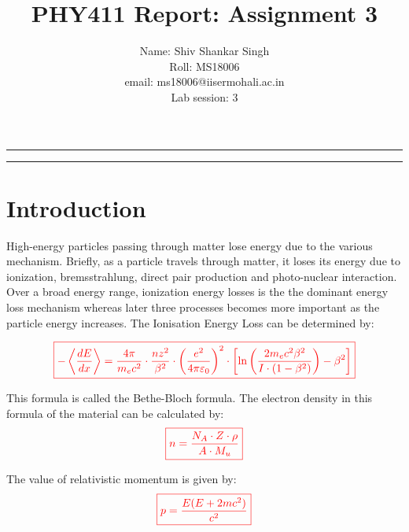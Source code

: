 \documentclass[a4paper,12pt]{article}
\begin{document}
\title{PHY411 Report: Assignment 3}
\author{
 Name: Shiv Shankar Singh \\
 Roll: MS18006 \\ 
 email: ms18006@iisermohali.ac.in \\
 Lab session: 3  \\ %
}

\date{}

\maketitle
\vskip 15pt
\hrule
\tableofcontents
\vskip 15pt
\hrule



\section{Introduction} 
 High-energy particles passing through matter lose energy due to the various mechanism. Briefly, as a particle travels through matter, it loses its energy due to ionization, bremsstrahlung, direct pair production and photo-nuclear interaction. Over a broad energy range, ionization energy losses is the the dominant energy loss mechanism whereas later three processes becomes more important as the particle energy increases. The Ionisation Energy Loss can be determined by: 

\begin{equation}\textcolor{red}{\boxed{
    \displaystyle -\left\langle{\frac {dE}{dx}}\right\rangle ={\frac {4\pi }{m_{e}c^{2}}}\cdot {\frac {nz^{2}}{\beta ^{2}}}\cdot \left({\frac {e^{2}}{4\pi \varepsilon _{0}}}\right)^{2}\cdot \left[\ln \left({\frac {2m_{e}c^{2}\beta ^{2}}{I\cdot (1-\beta ^{2})}}\right)-\beta ^{2}\right]}}
\end{equation}


This formula is called the Bethe-Bloch formula. The electron density in this formula of the material can be calculated by: 
\begin{equation}\textcolor{red}{\boxed{
    n={\frac {N_{A}\cdot Z\cdot \rho }{A\cdot M_{u}}}}}
\end{equation}


The value of relativistic momentum is given by:
\begin{equation}\textcolor{red}{\boxed{
    p = \frac{E(E+2mc^2)}{c^2}}}
\end{equation}
\end{document}
